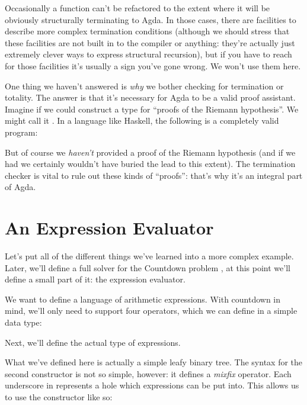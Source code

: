 Occasionally a function can't be refactored to the extent where it will be
obviously structurally terminating to Agda.
In those cases, there are facilities to describe more complex termination
conditions (although we should stress that these facilities are not
built in to the compiler or anything: they're actually just extremely clever
ways to express structural recursion), but if you have to reach for those
facilities it's usually a sign you've gone wrong.
We won't use them here.

One thing we haven't answered is \emph{why} we bother checking for termination
or totality.
The answer is that it's necessary for Agda to be a valid proof assistant.
Imagine if we could construct a type for ``proofs of the Riemann hypothesis''.
We might call it .
In a language like Haskell, the following is a completely valid program:
\begin{agdalisting*}
\end{agdalisting*}
But of course we \emph{haven't} provided a proof of the Riemann hypothesis (and
if we had we certainly wouldn't have buried the lead to this extent).
The termination checker is vital to rule out these kinds of ``proofs'': that's
why it's an integral part of Agda.
\section{An Expression Evaluator}
Let's put all of the different things we've learned into a more complex example.
Later, we'll define a full solver for the Countdown problem
\cite{huttonCountdownProblem2002} , at this
point we'll define a small part of it: the expression evaluator.

We want to define a language of arithmetic expressions.
With countdown in mind, we'll only need to support four operators, which we can
define in a simple data type:
\begin{agdalisting}
\end{agdalisting}
Next, we'll define the actual type of expressions.
\begin{agdalisting}
\end{agdalisting}
What we've defined here is actually a simple leafy binary tree.
The syntax for the second constructor is not so simple, however: it defines a
\emph{mixfix} operator.
Each underscore in \AgdaInductiveConstructor{\(\_\langle \_ \rangle\_\)}
represents a hole which expressions can be put into.
This allows us to use the constructor like so:
\begin{agdalisting*}
\end{agdalisting*}

